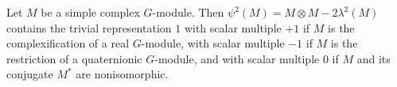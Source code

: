 Let $M$ be a simple complex $G$-module. Then $\psi^2(M) = M \otimes M - 2\lambda^2(M)$ contains the trivial representation $1$ with scalar multiple $+1$ if $M$ is the complexification of a real $G$-module, with scalar multiple $-1$ if $M$ is the restriction of a quaternionic $G$-module, and with scalar multiple $0$ if $M$ and its conjugate $M^*$ are nonisomorphic.
